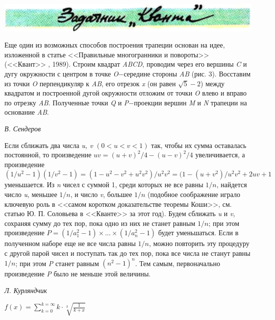     \begin{minipage}{0.75\textwidth}
        \includegraphics[scale=0.90]{header2.png} \par
    \vspace{8pt}
    \hspace{10pt} 
    Еще один из возможных способов построения трапеции основан на идее, изложенной в статье <<Правильные многогранники и повороты>> (<<Квант>> , 1989). Строим квадрат \textit{ABCD}, проводим через его вершины \textit{C} и  дугу окружности с центром в точке \textit{O}$-$середине стороны \textit{AB} (рис. 3). Восставим из точки \textit{O} перпендикуляр к \textit{AB}, его отрезок \textit{x} (он равен $\sqrt{5}-2$) между квадратом и построенной дугой окружности отложим от точки \textit{O} влево и вправо по отрезку \textit{AB}. Полученные точки \textit{Q} и \textit{P}$-$проекции вершин \textit{M} и \textit{N} трапеции на основание \textit{AB}. 
    
    \hspace*{\fill} \textit{В. Сендеров} 
    
    \vspace{0.6cm}
    
    Если сближать два числа \textit{u, v} $(0<u<v<1)$ так, чтобы их сумма оставалась постоянной, то произведение $uv=(u+v)^2/4-(u-v)^2/4$ увеличивается, а произведение $(1/u^2-1)(1/v^2-1)=(1-u^2-v^2+u^2v^2)/u^2v^2=(1-(u+v^2)/u^2v^2+2uv+1$ уменьшается. Из \textit{n} чисел с суммой 1, среди которых не все равны $1/n$, найдется число \textit{u}, меньшее $1/n$, и число \textit{v}, большее $1/n$ (подобное соображение играло ключевую роль в <<самом коротком доказательстве теоремы Коши>>, см. статью Ю. П. Соловьева в <<Кванте>>  за этот год). Будем сближать \textit{u} и \textit{v}, сохраняя сумму до тех пор, пока одно из них не станет равным $1/n$; при этом произведение $P=(1/a^2_1-1)\times...\times(1/a^2_n-1)$ будет уменьшаться. Если в полученном наборе еще не все числа равны $1/n$, можно повторить эту процедуру с другой парой чисел и поступать так до тех пор, пока все числа не станут равны $1/n$; при этом \textit{P} станет равным $(n^2-1)^n$. Тем самым, первоначально произведение \textit{P} было не меньше этой величины.
    
    \hspace*{\fill} \textit{Л. Курляндчик}
    
    $f(x)=\sum\limits^{k=\infty}_{k=0}k\cdot\sqrt[3]{\frac{1}{k+x}}$
    \end{minipage}
